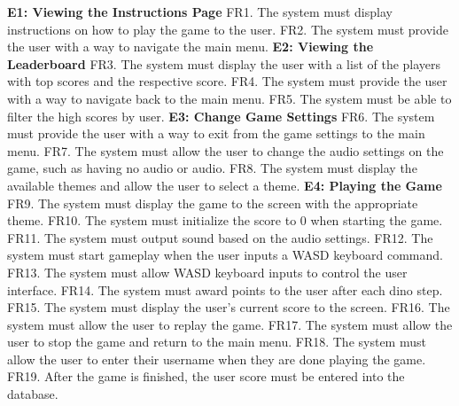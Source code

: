 \documentclass[12pt]{article}
\begin{document}
\textbf{E1: Viewing the Instructions Page} \newline
FR1. The system must display instructions on how to play the game to the user. \newline
FR2. The system must provide the user with a way to navigate the main menu. \newline \newline
\textbf{E2: Viewing the Leaderboard} \newline
FR3. The system must display the user with a list of the players with top scores and the respective score.  \newline
FR4. The system must provide the user with a way to navigate back to the main menu. \newline
FR5. The system must be able to filter the high scores by user. \newline \newline
\textbf{E3: Change Game Settings} \newline
FR6. The system must provide the user with a way to exit from the game settings to the main menu. \newline
FR7. The system must allow the user to change the audio settings on the game, such as having no audio or audio. \newline
FR8. The system must display the available themes and allow the user to select a theme. \newline \newline
\textbf{E4: Playing the Game} \newline
FR9. The system must display the game to the screen with the appropriate theme. \newline
FR10. The system must initialize the score to 0 when starting the game. \newline
FR11. The system must output sound based on the audio settings. \newline
FR12. The system must start gameplay when the user inputs a WASD keyboard command. \newline
FR13. The system must allow WASD keyboard inputs to control the user interface.\newline
FR14. The system must award points to the user after each dino step. \newline
FR15. The system must display the user’s current score to the screen. \newline
FR16. The system must allow the user to replay the game. \newline
FR17. The system must allow the user to stop the game and return to the main menu. \newline
FR18. The system must allow the user to enter their username when they are done playing the game. \newline
FR19. After the game is finished, the user score must be entered into the database. \newline
\end{document}
